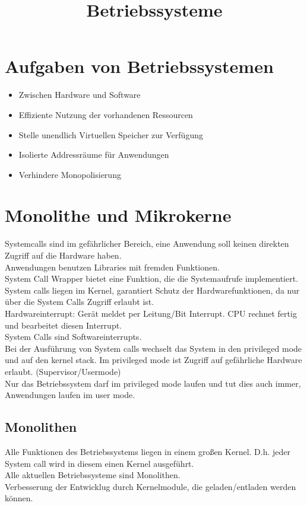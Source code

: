 \documentclass[a4paper]{article}
\begin{document}
\title{Betriebssysteme}
\maketitle
\section{Aufgaben von Betriebssystemen}
\begin{itemize}
\item Zwischen Hardware und Software
\item Effiziente Nutzung der vorhandenen Ressourcen
\item Stelle unendlich Virtuellen Speicher zur Verfügung
\item Isolierte Addressräume für Anwendungen
\item Verhindere Monopolisierung
\end{itemize}
\section{Monolithe und Mikrokerne}
Systemcalls sind im gefährlicher Bereich, eine Anwendung soll keinen direkten Zugriff auf die Hardware haben.\\
Anwendungen benutzen Libraries mit fremden Funktionen.\\
System Call Wrapper bietet eine Funktion, die die Systemaufrufe implementiert.\\
System calls liegen im Kernel, garantiert Schutz der Hardwarefunktionen, da nur über die System Calls Zugriff erlaubt ist.\\
Hardwareinterrupt: Gerät meldet per Leitung/Bit Interrupt. CPU rechnet fertig und bearbeitet diesen Interrupt.\\
System Calls sind Softwareinterrupts.\\
Bei der Ausführung von System calls wechselt das System in den privileged mode und auf den kernel stack. Im privileged mode ist Zugriff auf gefährliche Hardware erlaubt. (Supervisor/Usermode)\\
Nur das Betriebssystem darf im privileged mode laufen und tut dies auch immer, Anwendungen laufen im user mode.
\subsection{Monolithen}
Alle Funktionen des Betriebssystems liegen in einem großen Kernel. D.h. jeder System call wird in diesem einen Kernel ausgeführt.\\
Alle aktuellen Betriebssysteme sind Monolithen.\\
Verbesserung der Entwicklug durch Kernelmodule, die geladen/entladen werden können.
\end{document}
